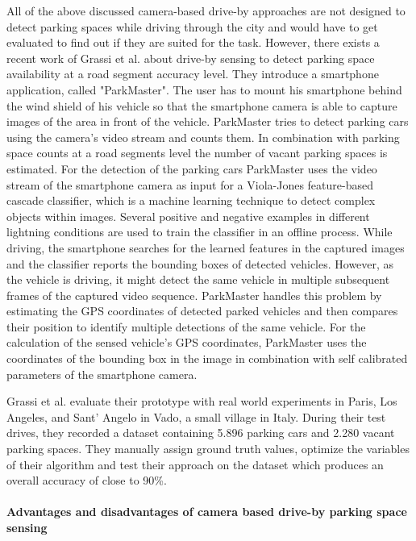 All of the above discussed camera-based drive-by approaches are not designed to detect parking spaces while driving through the city and would have to get evaluated to find out if they are suited for the task. However, there exists a recent work of Grassi et al. \cite{Grassi:2017:PIE:3132211.3134452} about drive-by sensing to detect parking space availability at a road segment accuracy level. They introduce a smartphone application, called "ParkMaster". The user has to mount his smartphone behind the wind shield of his vehicle so that the smartphone camera is able to capture images of the area in front of the vehicle. ParkMaster tries to detect parking cars using the camera's video stream and counts them. In combination with parking space counts at a road segments level the number of vacant parking spaces is estimated. For the detection of the parking cars ParkMaster uses the video stream of the smartphone camera as input for a Viola-Jones feature-based cascade classifier, which is a machine learning technique to detect complex objects within images. Several positive and negative examples in different lightning conditions are used to train the classifier in an offline process. While driving, the smartphone searches for the learned features in the captured images and the classifier reports the bounding boxes of detected vehicles. However, as the vehicle is driving, it might detect the same vehicle in multiple subsequent frames of the captured video sequence. ParkMaster handles this problem by estimating the GPS coordinates of detected parked vehicles and then compares their position to identify multiple detections of the same vehicle. 
For the calculation of the sensed vehicle's GPS coordinates, ParkMaster uses the coordinates of the bounding box in the image in combination with self calibrated parameters of the smartphone camera.

Grassi et al. evaluate their prototype with real world experiments in Paris, Los Angeles, and Sant' Angelo in Vado, a small village in Italy. During their test drives, they recorded a dataset containing 5.896 parking cars and 2.280 vacant parking spaces. They manually assign ground truth values, optimize the variables of their algorithm and test their approach on the dataset which produces an overall accuracy of close to 90\%.



\paragraph{Advantages and disadvantages of camera based drive-by parking space sensing}

